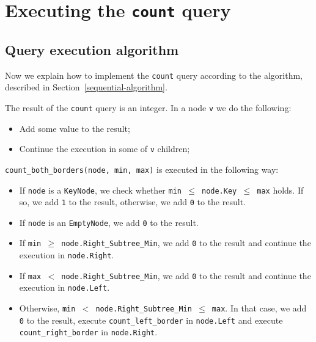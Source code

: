 \documentclass[times, dvipsnames,%
               languages={russian,english} %
              ]{itmo-student-thesis}
\begin{document}
\section{Executing the \texttt{count} query}
\label{count-execute-section}

\subsection{Query execution algorithm}

Now we explain how to implement the \texttt{count} query according to the algorithm, described in Section~\ref{sequential-algorithm}.

The result of the \texttt{count} query is an integer. In a node \texttt{v} we do the following:

\begin{itemize}
    \item Add some value to the result;
    
    \item Continue the execution in some of \texttt{v} children;
\end{itemize}

\bigbreak

\texttt{count\_both\_borders(node, min, max)} is executed in the following way:

\begin{itemize}
    \item If \texttt{node} is a \texttt{KeyNode}, we check whether \texttt{min $\leq$ node.Key $\leq$ max} holds. If so, we add \texttt{1} to the result, otherwise, we add \texttt{0} to the result.
    
    \item If \texttt{node} is an \texttt{EmptyNode}, we add \texttt{0} to the result.

    \item If \texttt{min $\geq$ node.Right\_Subtree\_Min}, we add \texttt{0} to the result and continue the execution in \texttt{node.Right}.
    
    \item If \texttt{max $<$ node.Right\_Subtree\_Min}, we add \texttt{0} to the result and continue the execution in \texttt{node.Left}.
    
    \item Otherwise, \texttt{min $<$ node.Right\_Subtree\_Min $\leq$ max}. In that case, we add \texttt{0} to the result, execute \texttt{count\_left\_border} in \texttt{node.Left} and execute \texttt{count\_right\_border} in \texttt{node.Right}. 
\end{itemize}
\end{document}
